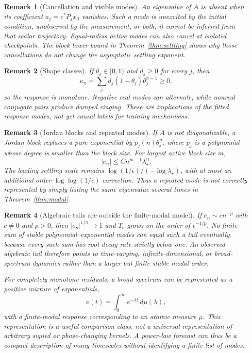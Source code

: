 \documentclass[10pt,twocolumn]{article}
\newtheorem{remark}{Remark}
\begin{document}
\begin{remark}[Cancellation and visible modes]\label{rem:cancellation}
An eigenvalue of $A$ is absent when its coefficient
$a_j=c^*P_jx_0$ vanishes.  Such a mode is unexcited by the initial condition,
unobserved by the measurement, or both; it cannot be inferred from that scalar
trajectory.  Equal-radius active modes can also cancel at isolated
checkpoints.  The block lower bound in Theorem~\ref{thm:settling} shows why
those cancellations do not change the asymptotic settling exponent.
\end{remark}

\begin{remark}[Shape classes]
If $\theta_j\in[0,1)$ and $d_j\geq0$ for every $j$, then
\[
 \kappa_n=\sum_j d_j(1-\theta_j)\theta_j^{n-1}\geq0,
\]
so the response is monotone.  Negative real modes can alternate, while
nonreal conjugate pairs produce damped ringing.  These are implications of the
fitted response modes, not yet causal labels for training mechanisms.
\end{remark}

\begin{remark}[Jordan blocks and repeated modes]\label{rem:jordan}
If $A$ is not diagonalizable, a Jordan block replaces a pure exponential by
$p_j(n)\theta_j^n$, where $p_j$ is a polynomial whose degree is smaller than
the block size.  For largest active block size $m$,
\[
 |e_n|\leq Cn^{m-1}\lambda_\star^n.
\]
The leading settling scale remains $\log(1/\epsilon)/(-\log\lambda_\star)$,
with at most an additional order-$\log\log(1/\epsilon)$ correction.  Thus a
repeated mode is not correctly represented by simply listing the same
eigenvalue several times in Theorem~\ref{thm:modal}.
\end{remark}

\begin{remark}[Algebraic tails are outside the finite-modal model]
If $e_n\sim cn^{-p}$ with $c\ne0$ and $p>0$, then
$|e_n|^{1/n}\to1$ and $T_\epsilon$ grows on the order of
$\epsilon^{-1/p}$.  No finite sum of stable polynomial--exponential modes can
equal such a tail eventually, because every such sum has root-decay rate
strictly below one.  An observed algebraic tail therefore points to
time-varying, infinite-dimensional, or broad-spectrum dynamics rather than a
larger but finite stable modal order.

For completely monotone residuals, a broad spectrum can be represented as a
positive mixture of exponentials,
\begin{equation}\label{eq:diffuse-spectrum}
 e(t)=\int_0^\infty e^{-\lambda t}\,d\mu(\lambda),
\end{equation}
with a finite-modal response corresponding to an atomic measure $\mu$.  This
representation is a useful comparison class, not a universal representation
of arbitrary signed or phase-changing kernels.  A power-law forecast can thus
be a compact description of many timescales without identifying a finite list
of modes.
\end{remark}
\end{document}
